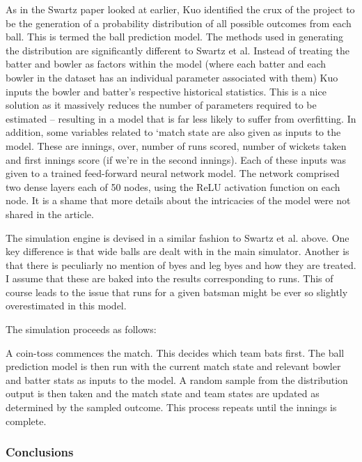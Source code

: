 As in the Swartz paper looked at earlier, Kuo identified the crux of the project to be the generation of a probability distribution of all possible outcomes from each ball. This is termed the ball prediction model. The methods used in generating the distribution are significantly different to Swartz et al. Instead of treating the batter and bowler as factors within the model (where each batter and each bowler in the dataset has an individual parameter associated with them) Kuo inputs the bowler and batter’s respective historical statistics. This is a nice solution as it massively reduces the number of parameters required to be estimated – resulting in a model that is far less likely to suffer from overfitting. \cite{everitt_cambridge_2010} In addition, some variables related to ‘match state are also given as inputs to the model. These are innings, over, number of runs scored, number of wickets taken and first innings score (if we’re in the second innings). Each of these inputs was given to a trained feed-forward neural network model. The network comprised two dense layers each of 50 nodes, using the ReLU activation function on each node. It is a shame that more details about the intricacies of the model were not shared in the article.

The simulation engine is devised in a similar fashion to Swartz et al. above. One key difference is that wide balls are dealt with in the main simulator. Another is that there is peculiarly no mention of byes and leg byes and how they are treated. I assume that these are baked into the results corresponding to runs. This of course leads to the issue that runs for a given batsman might be ever so slightly overestimated in this model.\footnotemark{}


The simulation proceeds as follows:

A coin-toss commences the match. This decides which team bats first. The ball prediction model is then run with the current match state and relevant bowler and batter stats as inputs to the model. A random sample from the distribution output is then taken and the match state and team states are updated as determined by the sampled outcome. This process repeats until the innings is complete.

\subsubsection{Conclusions}


